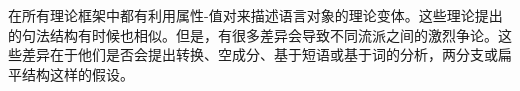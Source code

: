 在所有理论框架中都有利用属性-值对来描述语言对象的理论变体。这些理论提出的句法结构有时候也相似。但是，有很多差异会导致不同流派之间的激烈争论。这些差异在于他们是否会提出转换、空成分、基于短语或基于词的分析，两分支或扁平结构这样的假设。

